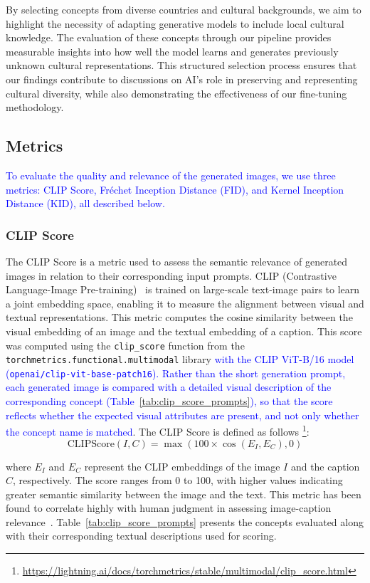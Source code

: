 \documentclass[pdflatex,sn-mathphys-num]{sn-jnl}%
\theoremstyle{thmstyleone}%
\theoremstyle{thmstyletwo}%
\theoremstyle{thmstylethree}%
\begin{document}
By selecting concepts from diverse countries and cultural backgrounds, we aim to highlight the necessity of adapting generative models to include local cultural knowledge. The evaluation of these concepts through our pipeline provides measurable insights into how well the model learns and generates previously unknown cultural representations. This structured selection process ensures that our findings contribute to discussions on AI’s role in preserving and representing cultural diversity, while also demonstrating the effectiveness of our fine-tuning methodology.

\subsection{Metrics}
\textcolor{blue}{To evaluate the quality and relevance of the generated images, we use three metrics: CLIP Score, Fréchet Inception Distance (FID), and Kernel Inception Distance (KID), all described below.}

\subsubsection{CLIP Score}
The CLIP Score is a metric used to assess the semantic relevance of generated images in relation to their corresponding input prompts.  CLIP (Contrastive Language-Image Pre-training)~\cite{clip} is trained on large-scale text-image pairs to learn a joint embedding space, enabling it to measure the alignment between visual and textual representations. This metric computes the cosine similarity between the visual embedding of an image and the textual embedding of a caption. This score was computed using the \texttt{clip\_score} function from the \texttt{torchmetrics.functional.multimodal} library\textcolor{blue}{ with the CLIP ViT-B/16 model (\texttt{openai/clip-vit-base-patch16}). Rather than the short generation prompt, each generated image is compared with a detailed visual description of the corresponding concept (Table~\ref{tab:clip_score_prompts}), so that the score reflects whether the expected visual attributes are present, and not only whether the concept name is matched}. The CLIP Score is defined as follows \footnote{\url{https://lightning.ai/docs/torchmetrics/stable/multimodal/clip_score.html}}:
\[
\text{CLIPScore}(I, C) = \max(100 \times \cos(E_I, E_C), 0)
\]

where \( E_I \) and \( E_C \) represent the CLIP embeddings of the image \( I \) and the caption \( C \), respectively. The score ranges from 0 to 100, with higher values indicating greater semantic similarity between the image and the text. This metric has been found to correlate highly with human judgment in assessing image-caption relevance~\cite{hessel2021clipscore}. Table~\ref{tab:clip_score_prompts} presents the concepts evaluated along with their corresponding textual descriptions used for scoring.
\end{document}
